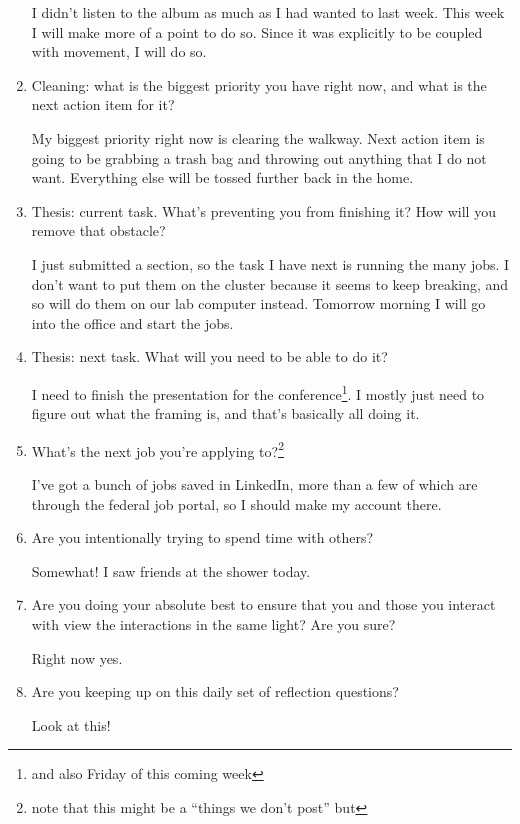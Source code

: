 \documentclass[12pt]{article}
\newcommand{\say}[1]{``#1''}
\renewcommand{\,}{\textsuperscript{,}}
\begin{document}
\begin{enumerate}
I didn't listen to the album as much as I had wanted to last week.  
This week I will make more of a point to do so.  
Since it was explicitly to be coupled with movement, I will do so.

\item Cleaning: what is the biggest priority you have right now, and what is the next action item for it?

My biggest priority right now is clearing the walkway. Next action item is going to be grabbing a trash bag and throwing out anything that I do not want.  
Everything else will be tossed further back in the home.

\item Thesis: current task. What's preventing you from finishing it? How will you remove that obstacle?

I just submitted a section, so the task I have next is running the many jobs. I don't want to put them on the cluster because it seems to keep breaking, and so will do them on our lab computer instead. Tomorrow morning I will go into the office and start the jobs.

\item Thesis: next task. What will you need to be able to do it?

I need to finish the presentation for the conference\footnote{and also Friday of this coming week}. I mostly just need to figure out what the framing is, and that's basically all doing it.

\item What's the next job you're applying to?\footnote{note that this might be a \say{things we don't post} but}

I've got a bunch of jobs saved in LinkedIn, more than a few of which are through the federal job portal, so I should make my account there.

\item Are you intentionally trying to spend time with others?

Somewhat! I saw friends at the shower today.

\item Are you doing your absolute best to ensure that you and those you interact with view the interactions in the same light? Are you sure?

Right now yes.

\item Are you keeping up on this daily set of reflection questions?

Look at this!


\end{enumerate}
\end{document}
